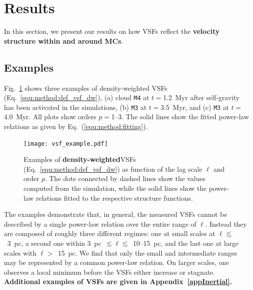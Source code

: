 \section{Results}\label{results}

In this section, we present our results on how VSFs reflect the \textbf{velocity structure within and around MCs}.

\subsection{Examples}\label{results:example}

Fig.~\ref{pic:results:vsf_example} shows three examples of density-weighted VSFs (Eq.~\ref{equ:method:def_vsf_dw}), (a) cloud \texttt{M4} at $t=$1.2~Myr after self-gravity has been activated in the simulations, (b) \texttt{M3} at $t=$3.5~Myr, and (c) \texttt{M3} at $t=$4.0~Myr.
All plots show orders $p=$1--3.
The solid lines show the fitted power-law relations as given by Eq.~(\ref{equ:method:fitting}).

\begin{figure}[!htb]
	\centering
	\texttt{[image: vsf\_example.pdf]}
	\caption{Examples of \textbf{density-weighted}VSFs (Eq.~\ref{equ:method:def_vsf_dw})  as function of the lag scale $\ell$ and order $p$. 
		The dots connected by dashed lines show the values computed from the simulation, while
		the solid lines show the power-law relations fitted to the respective structure functions.
	}
	\label{pic:results:vsf_example}
\end{figure}

The examples demonstrate that, in general, the measured VSFs cannot be described by a single power-law relation over the entire range of $\ell$.
Instead they are composed of roughly three different regimes: 
one at small scales at  $\ell \lesssim$~3~pc, a second one within 3~pc~$\lesssim \ell \lesssim$~10--15~pc, and the last one at large scales with $\ell >$~15~pc. 
We find that only the small and intermediate ranges may be represented by a common power-law relation.
On larger scales, one observes a local minimum before the VSFs either increase or stagnate.
\textbf{Additional examples of VSFs are given in Appendix~\ref{appInertial}.}

